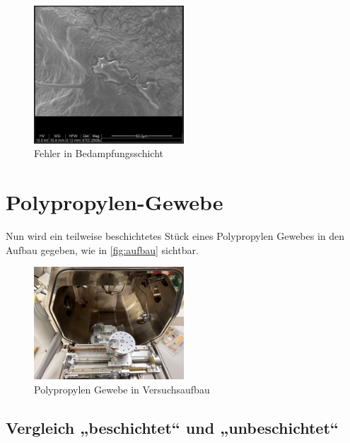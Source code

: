 \documentclass[12pt,english,ngerman]{scrartcl}
\begin{document}
\begin{figure}[H]
	\begin{center}
		\includegraphics[width =0.5\textwidth]{./figures/damage.png}
	\end{center}
	\caption{Fehler in Bedampfungsschicht}
    \label{fig:damage}
\end{figure}


\section{Polypropylen-Gewebe}

Nun wird ein teilweise beschichtetes Stück eines Polypropylen Gewebes in den Aufbau gegeben, wie in \autoref{fig:aufbau} sichtbar.

\begin{figure}[H]
	\begin{center}
		\includegraphics[width =0.5\textwidth]{./figures/aufbau.png}
	\end{center}
	\caption{Polypropylen Gewebe in Versuchsaufbau}
    \label{fig:aufbau}
\end{figure}


\subsection{Vergleich „beschichtet“ und „unbeschichtet“}
\end{document}
